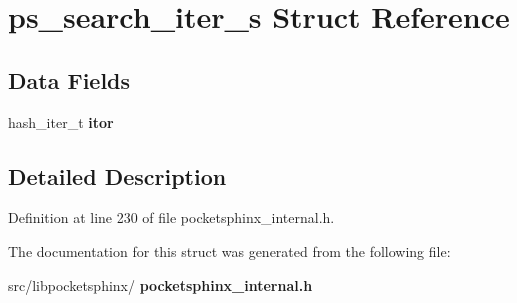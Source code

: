 \section{ps\+\_\+search\+\_\+iter\+\_\+s Struct Reference}
\label{structps__search__iter__s}
\subsection*{Data Fields}
\begin{DoxyCompactItemize}
\item 
\mbox{\label{structps__search__iter__s_a08c98d4145043af325263a80020758f7}} 
hash\+\_\+iter\+\_\+t {\bfseries itor}
\end{DoxyCompactItemize}


\subsection{Detailed Description}


Definition at line 230 of file pocketsphinx\+\_\+internal.\+h.



The documentation for this struct was generated from the following file\+:\begin{DoxyCompactItemize}
\item 
src/libpocketsphinx/\textbf{ pocketsphinx\+\_\+internal.\+h}\end{DoxyCompactItemize}
